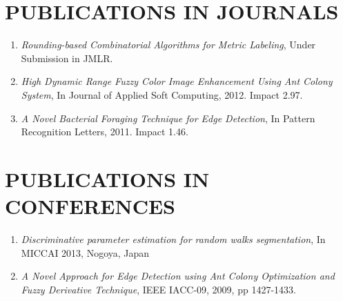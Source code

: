 \documentclass{res}
\begin{document}
\begin{resume}
        \section{PUBLICATIONS IN JOURNALS} 
        \begin{enumerate}
        \item \emph{Rounding-based Combinatorial Algorithms for Metric Labeling}, {Under Submission in JMLR}.
        \item \emph{High Dynamic Range Fuzzy Color Image Enhancement Using Ant Colony System}, {In Journal of Applied Soft Computing}, 2012. Impact 2.97.
        \item \emph{A Novel Bacterial Foraging Technique for Edge Detection}, {In Pattern Recognition Letters}, 2011. Impact 1.46.

        \end{enumerate}  


        \section{PUBLICATIONS IN CONFERENCES }
        \begin{enumerate}
        \item \emph{Discriminative parameter estimation for random walks segmentation}, { In MICCAI 2013, Nogoya, Japan}
        \item \emph{A Novel Approach for Edge Detection using Ant Colony Optimization and Fuzzy Derivative Technique}, { IEEE IACC-09}, 2009, pp 1427-1433.           


\end{enumerate}
\end{resume}
\end{document}
